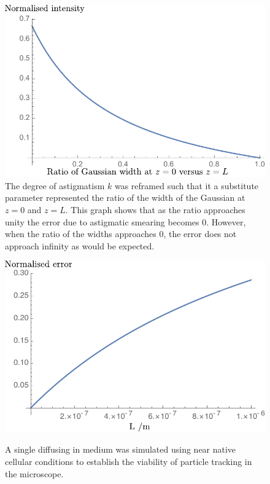 \begin{figure}
  \includegraphics{./mathematica/Expected_versus_reality_error}
  \caption{The degree of astigmatism $k$ was reframed such that it a substitute parameter represented the ratio of the width of the Gaussian at $z=0$ and $z=L$.
  This graph shows that as the ratio approaches unity the error due to astigmatic smearing becomes $0$.
  However, when the ratio of the widths approaches 0, the error does not approach infinity as would be expected.
  }
  \label{fig:Expected_versus_reality_error}
\end{figure}

\begin{figure}
  \centering
  \includegraphics{./mathematica/Error_vs_L}
  \caption{}
  \label{fig:Error_vs_L}
\end{figure}

\begin{figure}
  \centering
  \caption{A single diffusing in medium was simulated using near native cellular conditions to establish the viability of particle tracking in the microscope.}
  \label{}
\end{figure}

